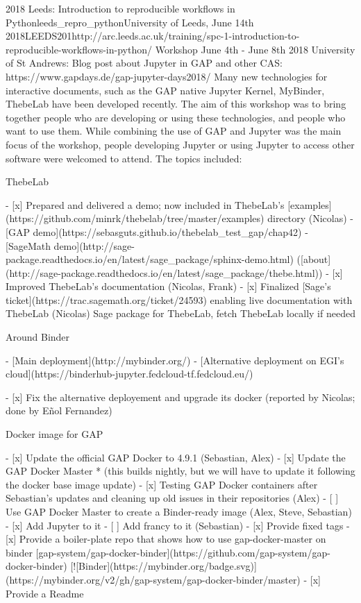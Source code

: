 \begin{Aim 1}
\begin{Aim 2}
\begin{event}{2018 Leeds: Introduction to reproducible workflows in Python}{leeds_repro_python}{University of Leeds, June 14th 2018}{LEEDS}{20}{1}{http://arc.leeds.ac.uk/training/spc-1-introduction-to-reproducible-workflows-in-python/}
Workshop June 4th - June 8th 2018 University of St Andrews:
Blog post about Jupyter in GAP and other CAS: https://www.gapdays.de/gap-jupyter-days2018/
Many new technologies for interactive documents, such as the GAP native Jupyter Kernel, MyBinder, ThebeLab have been developed recently. The aim of this workshop was to bring together people who are developing or using these technologies, and people who want to use them. While combining the use of GAP and Jupyter was the main focus of the workshop, people developing Jupyter or using Jupyter to access other software were welcomed to attend. The topics included:

      ThebeLab

- [x] Prepared and delivered a demo; now included in ThebeLab's [examples](https://github.com/minrk/thebelab/tree/master/examples) directory (Nicolas)
- [GAP demo](https://sebasguts.github.io/thebelab_test_gap/chap42)
- [SageMath demo](http://sage-package.readthedocs.io/en/latest/sage_package/sphinx-demo.html) ([about](http://sage-package.readthedocs.io/en/latest/sage_package/thebe.html))
- [x] Improved ThebeLab's documentation (Nicolas, Frank) 
- [x] Finalized [Sage's ticket](https://trac.sagemath.org/ticket/24593) enabling live documentation with ThebeLab (Nicolas)
  Sage package for ThebeLab, fetch ThebeLab locally if needed

      Around Binder

- [Main deployment](http://mybinder.org/)
- [Alternative deployment on EGI's cloud](https://binderhub-jupyter.fedcloud-tf.fedcloud.eu/)

- [x] Fix the alternative deployement and upgrade its docker (reported by Nicolas; done by Eñol Fernandez)
 
      Docker image for GAP

- [x] Update the official GAP Docker to 4.9.1 (Sebastian, Alex)
- [x] Update the GAP Docker Master
         * (this builds nightly, but we will have to update it following the docker base image update)
- [x] Testing GAP Docker containers after Sebastian's updates and cleaning up old issues in their repositories (Alex)
- [ ] Use GAP Docker Master to create a Binder-ready image (Alex, Steve, Sebastian)
    - [x] Add Jupyter to it
    - [ ] Add francy to it (Sebastian)
    - [x] Provide fixed tags
    - [x] Provide a boiler-plate repo that shows how to use gap-docker-master on binder [gap-system/gap-docker-binder](https://github.com/gap-system/gap-docker-binder) [![Binder](https://mybinder.org/badge.svg)](https://mybinder.org/v2/gh/gap-system/gap-docker-binder/master)
    - [x] Provide a Readme


\end{event}
\end{Aim 2}
\end{Aim 1}
